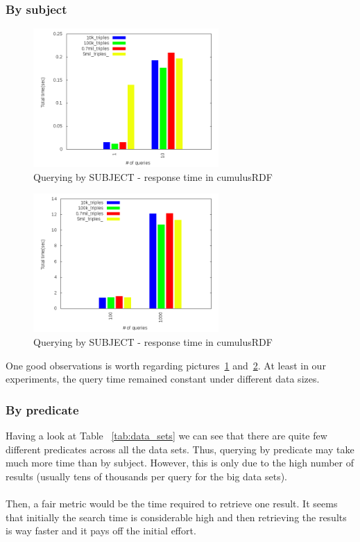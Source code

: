 \documentclass[a4paper,10pt]{article}
\begin{document}
\subsubsection{By subject}
\begin{figure}[h!]
  \centering
  \includegraphics[height=200px]{../cassandra/plots/plot_q_time_by_subj_1_10.png}
  \caption{Querying by SUBJECT - response time in cumulusRDF}
  \label{fig:query_subject_1}
\end{figure}
\begin{figure}[h!]
  \centering
  \includegraphics[height=200px]{../cassandra/plots/plot_q_time_by_subj_100_1000.png}
  \caption{Querying by SUBJECT - response time in cumulusRDF}
  \label{fig:query_subject_2}
\end{figure}
One good observations is worth regarding pictures~\ref{fig:query_subject_1} and~\ref{fig:query_subject_2}.
At least in our experiments, the query time remained constant under different data sizes. 

\subsubsection{By predicate}
Having a look at Table ~\ref{tab:data_sets} we can see that there are quite few different predicates across all the data sets. 
Thus, querying by predicate may take much more time than by subject. However, this is only due to the high number of results (usually 
tens of thousands per query for the big data sets).
\paragraph{}
Then, a fair metric would be the time required to retrieve one result. 
It seems that initially the search time is considerable high and then retrieving the results is way faster and it pays off the initial effort.
\end{document}
